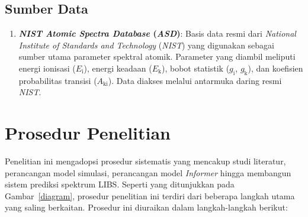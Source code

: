 \subsection{Sumber Data}
\begin{enumerate}
\item \textbf{\textit{NIST Atomic Spectra Database} (\textit{ASD})}: Basis data resmi dari \textit{National Institute of Standards and Technology} (\textit{NIST}) yang digunakan sebagai sumber utama parameter spektral atomik. Parameter yang diambil meliputi energi ionisasi (\(E_\text{i}\)), energi keadaan (\(E_\text{k}\)), bobot statistik (\(g_\text{i}\), \(g_\text{k}\)), dan koefisien probabilitas transisi (\(A_\text{ki}\)). Data diakses melalui antarmuka daring resmi \textit{NIST}.%
\end{enumerate}




\section{Prosedur Penelitian}

Penelitian ini mengadopsi prosedur sistematis yang mencakup studi literatur, perancangan model simulasi, perancangan model \textit{Informer} hingga membangun sistem prediksi spektrum LIBS. Seperti yang ditunjukkan pada Gambar~\ref{diagram}, prosedur penelitian ini terdiri dari beberapa langkah utama yang saling berkaitan. Prosedur ini diuraikan dalam langkah-langkah berikut:

